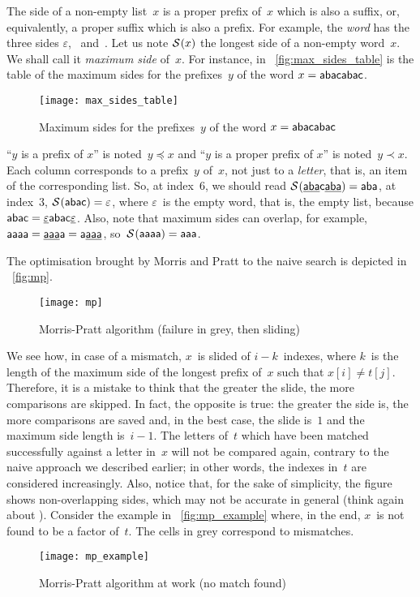 The side of a non\hyp{}empty list~\(x\) is a proper prefix of~\(x\)
which is also a suffix, or, equivalently, a proper suffix which is
also a prefix. For example, the \emph{word}  has the
three sides \(\varepsilon\), ~and~. Let us note
\(\mathcal{S}^{}(x)\) the longest side of a non\hyp{}empty word~\(x\). We
shall call it \emph{maximum side} of~\(x\). For instance, in
\fig~\vref{fig:max_sides_table} is the table of the maximum sides for
the prefixes~\(y\) of the word \(x=\textsf{abacabac}\).
\begin{figure}
\centering
\texttt{[image: max\_sides\_table]}
\caption{Maximum sides for the prefixes~\(y\) of the word
\(x=\textsf{abacabac}\)
\label{fig:max_sides_table}}
\end{figure}
``\(y\) is a prefix of \(x\)'' is noted~\({y \preccurlyeq x}\) and
``\(y\) is a proper prefix of \(x\)'' is noted~\({y \prec x}\). Each
column corresponds to a prefix~\(y\) of~\(x\), not just to a
\emph{letter}, that is, an item of the corresponding list. So, at
index~\(6\), we should read
\(\mathcal{S}^{}(\underline{\textsf{aba}}\textsf{c}\underline{\textsf{aba}}) =
\textsf{aba}\), at index~\(3\), \(\mathcal{S}^{}(\textsf{abac}) =
\varepsilon\), where \(\varepsilon\)~is the empty word, that is, the
empty list, because \(\textsf{abac} =
\underline{\varepsilon}\textsf{abac}\underline{\varepsilon}\). Also,
note that maximum sides can overlap, for example, \(\textsf{aaaa} =
\underline{\textsf{aaa}}\textsf{a} = \textsf{a}\underline{\textsf{aaa}}\),
so~\(\mathcal{S}^{}(\textsf{aaaa}) = \textsf{aaa}\).

The optimisation brought by Morris and Pratt to the naive search
is depicted in \fig~\vref{fig:mp}.
\begin{figure}[b]
\centering
\texttt{[image: mp]}
\caption{Morris\hyp{}Pratt algorithm (failure in grey, then sliding)
\label{fig:mp}}
\end{figure}
We see how, in case of a mismatch, \(x\)~is slided of
\({i-k}\)~indexes, where \(k\)~is the length of the maximum side of
the longest prefix of~\(x\) such that \(x[i] \neq t[j]\). Therefore,
it is a mistake to think that the greater the slide, the more
comparisons are skipped. In fact, the opposite is true: the greater
the side is, the more comparisons are saved and, in the best case, the
slide is~\(1\) and the maximum side length is~\({i-1}\). The letters
of~\(t\) which have been matched successfully against a letter
in~\(x\) will not be compared again, contrary to the naive approach we
described earlier; in other words, the indexes in~\(t\) are considered
increasingly. Also, notice that, for the sake of simplicity, the
figure shows non\hyp{}overlapping sides, which may not be accurate in
general (think again about ). Consider the example in
\fig~\vref{fig:mp_example} where, in the end, \(x\)~is not found to be
a factor of~\(t\). The cells in grey correspond to mismatches.
\begin{figure}
\centering
\texttt{[image: mp\_example]}
\caption{Morris\hyp{}Pratt algorithm at work (no match found)
\label{fig:mp_example}}
\end{figure}

